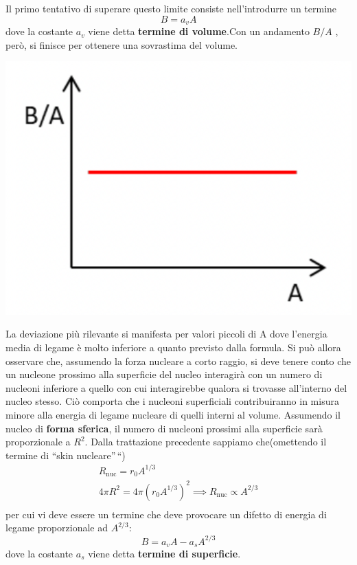 Il primo tentativo di superare questo limite consiste nell'introdurre un
termine \[
            B = a_{v} A
\] dove la costante \(a_{v}\) viene detta \textbf{termine di volume}.Con
un andamento \(B / A\) , però, si finisce per ottenere una sovrastima
del volume.
\begin{marginfigure}
    \includegraphics{figs/goccia1}
    \label{fig:goccia1}
\end{marginfigure}
La deviazione più rilevante si manifesta per valori piccoli di A dove
l'energia media di legame è molto inferiore a quanto previsto dalla
formula.
Si può allora osservare che, assumendo la forza nucleare a
corto raggio, si deve tenere conto che un nucleone prossimo alla
superficie del nucleo interagirà con un numero di nucleoni inferiore a
quello con cui interagirebbe qualora si trovasse all'interno del nucleo
stesso.
Ciò comporta che i nucleoni superficiali contribuiranno in
misura minore alla energia di legame nucleare di quelli interni al
volume.
Assumendo il nucleo di \textbf{forma sferica}, il numero di
nucleoni prossimi alla superficie sarà proporzionale a \(R^{2}\).
Dalla
trattazione precedente sappiamo che(omettendo il termine di ``skin
nucleare''\,``) \begin{gather*}
    R_{\text{nuc}} = r_{0}A^{1/3}\\
    4 \pi R^{2} = 4 \pi (r_{0}A^{1/3})^2 \implies R_{\text{nuc}} \propto A^{2/3}\\
\end{gather*} per cui vi deve essere un termine che deve provocare un difetto di
energia di legame proporzionale ad \(A^{2/3}\): \[
                                                    B = a_{v}A - a_{s}A^{2/3}
\] dove la costante \(a_{s}\) viene detta \textbf{termine di
superficie}.
